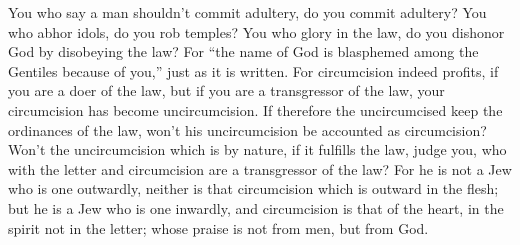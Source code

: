 {You who say a man shouldn’t commit adultery, do you commit adultery? You who abhor idols, do you rob temples?
You who glory in the law, do you dishonor God by disobeying the law?
For “the name of God is blasphemed among the Gentiles because of you,”
 just as it is written.
For circumcision indeed profits, if you are a doer of the law, but if you are a transgressor of the law, your circumcision has become uncircumcision.
If therefore the uncircumcised keep the ordinances of the law, won’t his uncircumcision be accounted as circumcision?
Won’t the uncircumcision which is by nature, if it fulfills the law, judge you, who with the letter and circumcision are a transgressor of the law?
For he is not a Jew who is one outwardly, neither is that circumcision which is outward in the flesh;
but he is a Jew who is one inwardly, and circumcision is that of the heart, in the spirit not in the letter; whose praise is not from men, but from God.

}
